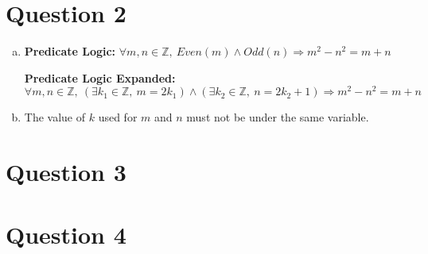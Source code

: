 \documentclass[12pt]{article}
\begin{document}
\begin{itemize}









\end{itemize}

\section*{Question 2}
\begin{enumerate}[a.]
    \item

    \textbf{Predicate Logic:} $\forall m,n \in \mathbb{Z},\:Even(m) \land Odd(n) \Rightarrow m^2 - n^2 = m + n$

    \bigskip

    \textbf{Predicate Logic Expanded:} $\forall m,n \in \mathbb{Z},\:(\exists k_1
    \in \mathbb{Z},\:m = 2k_1) \land (\exists k_2 \in \mathbb{Z},\: n = 2k_2 + 1)
    \Rightarrow m^2 - n^2 = m + n$

    \item The value of $k$ used for $m$ and $n$ must not be under the same variable.

\end{enumerate}

\section*{Question 3}

\section*{Question 4}
\end{document}
